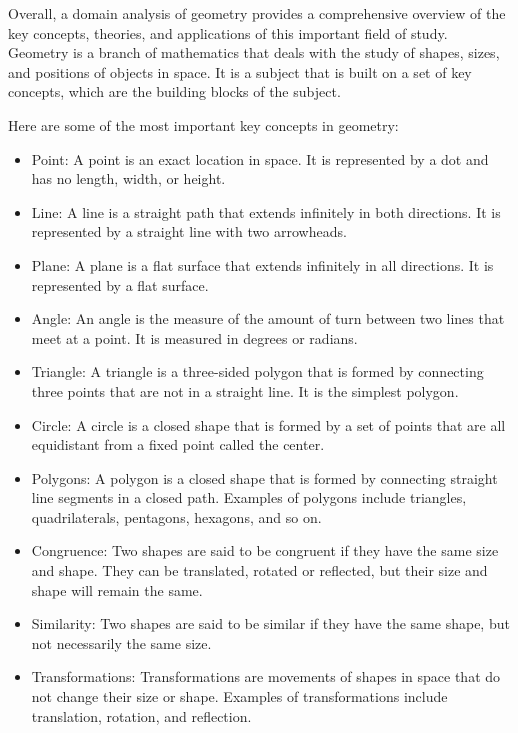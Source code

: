 \noindent Overall, a domain analysis of geometry provides a comprehensive overview of the key concepts, theories, and applications of this important field of study.
Geometry is a branch of mathematics that deals with the study of shapes, sizes, and positions of objects in space. It is a subject that is built on a set of key concepts, which are the building blocks of the subject. 
    
\noindent Here are some of the most important key concepts in geometry:
\begin{itemize}
\item Point: A point is an exact location in space. It is represented by a dot and has no length, width, or height.

\item Line: A line is a straight path that extends infinitely in both directions. It is represented by a straight line with two arrowheads.

\item Plane: A plane is a flat surface that extends infinitely in all directions. It is represented by a flat surface.

\item Angle: An angle is the measure of the amount of turn between two lines that meet at a point. It is measured in degrees or radians.

\item Triangle: A triangle is a three-sided polygon that is formed by connecting three points that are not in a straight line. It is the simplest polygon.

\item Circle: A circle is a closed shape that is formed by a set of points that are all equidistant from a fixed point called the center.

\item Polygons: A polygon is a closed shape that is formed by connecting straight line segments in a closed path. Examples of polygons include triangles, quadrilaterals, pentagons, hexagons, and so on.

\item Congruence: Two shapes are said to be congruent if they have the same size and shape. They can be translated, rotated or reflected, but their size and shape will remain the same.

\item Similarity: Two shapes are said to be similar if they have the same shape, but not necessarily the same size.

\item Transformations: Transformations are movements of shapes in space that do not change their size or shape. Examples of transformations include translation, rotation, and reflection.

\end{itemize}

